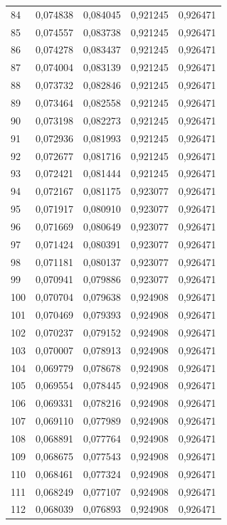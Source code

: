 \begin{tabular}{lrrrr}
84 & 0,074838 & 0,084045 & 0,921245 & 0,926471 \\
85 & 0,074557 & 0,083738 & 0,921245 & 0,926471 \\
86 & 0,074278 & 0,083437 & 0,921245 & 0,926471 \\
87 & 0,074004 & 0,083139 & 0,921245 & 0,926471 \\
88 & 0,073732 & 0,082846 & 0,921245 & 0,926471 \\
89 & 0,073464 & 0,082558 & 0,921245 & 0,926471 \\
90 & 0,073198 & 0,082273 & 0,921245 & 0,926471 \\
91 & 0,072936 & 0,081993 & 0,921245 & 0,926471 \\
92 & 0,072677 & 0,081716 & 0,921245 & 0,926471 \\
93 & 0,072421 & 0,081444 & 0,921245 & 0,926471 \\
94 & 0,072167 & 0,081175 & 0,923077 & 0,926471 \\
95 & 0,071917 & 0,080910 & 0,923077 & 0,926471 \\
96 & 0,071669 & 0,080649 & 0,923077 & 0,926471 \\
97 & 0,071424 & 0,080391 & 0,923077 & 0,926471 \\
98 & 0,071181 & 0,080137 & 0,923077 & 0,926471 \\
99 & 0,070941 & 0,079886 & 0,923077 & 0,926471 \\
100 & 0,070704 & 0,079638 & 0,924908 & 0,926471 \\
101 & 0,070469 & 0,079393 & 0,924908 & 0,926471 \\
102 & 0,070237 & 0,079152 & 0,924908 & 0,926471 \\
103 & 0,070007 & 0,078913 & 0,924908 & 0,926471 \\
104 & 0,069779 & 0,078678 & 0,924908 & 0,926471 \\
105 & 0,069554 & 0,078445 & 0,924908 & 0,926471 \\
106 & 0,069331 & 0,078216 & 0,924908 & 0,926471 \\
107 & 0,069110 & 0,077989 & 0,924908 & 0,926471 \\
108 & 0,068891 & 0,077764 & 0,924908 & 0,926471 \\
109 & 0,068675 & 0,077543 & 0,924908 & 0,926471 \\
110 & 0,068461 & 0,077324 & 0,924908 & 0,926471 \\
111 & 0,068249 & 0,077107 & 0,924908 & 0,926471 \\
112 & 0,068039 & 0,076893 & 0,924908 & 0,926471 \\

\end{tabular}

